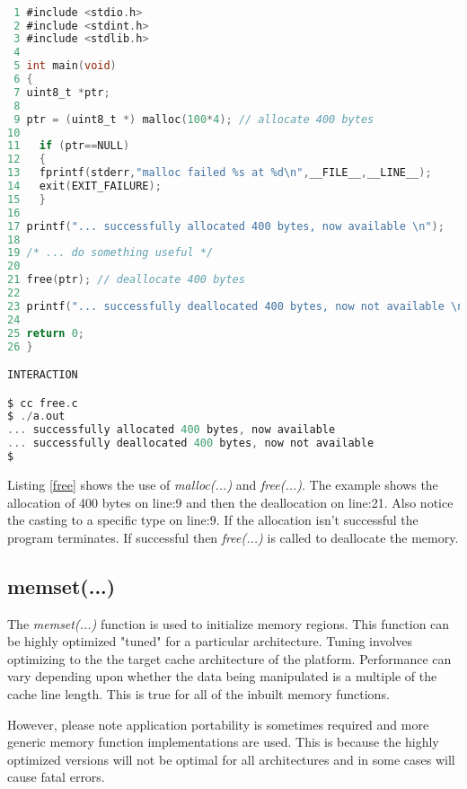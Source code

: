 \begin{lstlisting}[language=C,showstringspaces=false,caption={File: free.c},captionpos=b,label=free]

 1 #include <stdio.h>
 2 #include <stdint.h>
 3 #include <stdlib.h>
 4 
 5 int main(void)
 6 {
 7 uint8_t *ptr;
 8 
 9 ptr = (uint8_t *) malloc(100*4); // allocate 400 bytes
10   
11   if (ptr==NULL)
12   {
13   fprintf(stderr,"malloc failed %s at %d\n",__FILE__,__LINE__);
14   exit(EXIT_FAILURE);
15   }
16   
17 printf("... successfully allocated 400 bytes, now available \n");
18 
19 /* ... do something useful */
20 
21 free(ptr); // deallocate 400 bytes
22 
23 printf("... successfully deallocated 400 bytes, now not available \n");
24 
25 return 0;
26 }

INTERACTION

$ cc free.c
$ ./a.out
... successfully allocated 400 bytes, now available 
... successfully deallocated 400 bytes, now not available 
$ 

\end{lstlisting}

Listing \ref{free} shows the use of \textit{malloc(...)} and \textit{free(...)}. The example shows the allocation of 400 bytes on line:9 and then the deallocation on line:21. Also notice the casting to a specific type on line:9. If the allocation isn't successful the program terminates. If successful then \textit{free(...)} is called to deallocate the memory.
 
\subsection{memset(...)}

The \textit{memset(...)} function is used to initialize memory regions. This function can be highly optimized "tuned" for a particular architecture. Tuning involves optimizing to the the target cache architecture of the platform. Performance can vary depending upon whether the data being manipulated is a multiple of the cache line length. This is true for all of the inbuilt memory functions. 

However, please note application portability is sometimes required and more generic memory function implementations are used. This is because the highly optimized versions will not be optimal for all architectures and in some cases will cause fatal errors.

